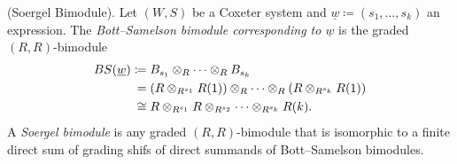 \noindent\begin{definition}\textup{(Soergel Bimodule).} Let $(W, S)$ be a Coxeter system and $\underline{w} \coloneqq (s_1, \dots, s_k)$ an expression. The {\em Bott--Samelson bimodule corresponding to $\underline{w}$} is the graded $(R, R)$-bimodule
\begin{align*}
\begin{split}
BS(\underline{w}) &\coloneqq B_{s_1} \otimes_R \cdots \otimes_R B_{s_k}\\
&\hphantom{\coloneqq}\nhphantom{=}= (R \otimes_{R^{s_1}} R(1)) \otimes_R \cdots \otimes_R (R \otimes_{R^{s_k}} R(1))\\
&\hphantom{\coloneqq}\nhphantom{$\cong$}\cong R \otimes_{R^{s_1}} R \otimes_{R^{s_2}} \cdots \otimes_{R^{s_k}} R(k).
\end{split}
\end{align*}
\noindent A {\em Soergel bimodule} is any graded $(R, R)$-bimodule that is isomorphic to a finite direct sum of grading shifs of direct summands of Bott--Samelson bimodules.\\
\end{definition}



